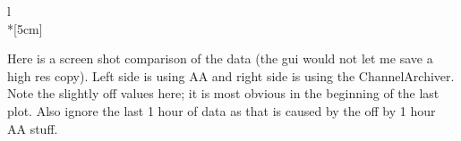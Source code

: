 \documentclass{article}
\begin{document}
\begin{figure}[H]
\end{figure}

l\\*[5cm]

Here is a screen shot comparison of the data (the gui would not let me save a high res copy). Left side is using AA and right side is using the ChannelArchiver. Note the slightly off values here; it is most obvious in the beginning of the last plot. Also ignore the last 1 hour of data as that is caused by the off by 1 hour AA stuff.

\begin{figure}[H]
\centering
{}
\end{figure}












\end{document}
